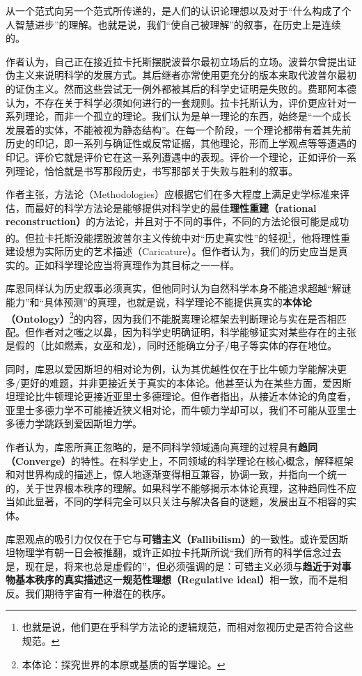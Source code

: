 \documentclass[12pt, a4paper, oneside]{ctexart}
\renewcommand{\b}{\textbf}
\newcommand{\f}{\footnote}
\begin{document}
从一个范式向另一个范式所传递的，是人们的认识论理想以及对于“什么构成了个人智慧进步”的理解。也就是说，我们“使自己被理解”的叙事，在历史上是连续的。

作者认为，自己正在接近拉卡托斯摆脱波普尔最初立场后的立场。波普尔曾提出证伪主义来说明科学的发展方式。其后继者亦常使用更充分的版本来取代波普尔最初的证伪主义。然而这些尝试无一例外都被其后的科学史证明是失败的。费耶阿本德认为，不存在关于科学必须如何进行的一套规则。拉卡托斯认为，评价更应针对一系列理论，而非一个孤立的理论。我们认为是单一理论的东西，始终是“一个成长发展着的实体，不能被视为静态结构”。在每一个阶段，一个理论都带有着其先前历史的印记，即一系列与确证性或反常证据，其他理论，形而上学观点等等遭遇的印记。评价它就是评价它在这一系列遭遇中的表现。评价一个理论，正如评价一系列理论，恰恰就是书写那段历史，书写那部关于失败与胜利的叙事。

作者主张，方法论（Methodologies）应根据它们在多大程度上满足史学标准来评估，而最好的科学方法论是能够提供对科学史的最佳\b{理性重建（rational reconstruction）}的方法论，并且对于不同的事件，不同的方法论很可能是成功的。但拉卡托斯没能摆脱波普尔主义传统中对“历史真实性”的轻视\f{也就是说，他们更在乎科学方法论的逻辑规范，而相对忽视历史是否符合这些规范。}，他将理性重建设想为实际历史的艺术描述（Caricature）。但作者认为，我们的历史应当是真实的。正如科学理论应当将真理作为其目标之一一样。

库恩同样认为历史叙事必须真实，但他同时认为自然科学本身不能追求超越“解谜能力”和“具体预测”的真理，也就是说，科学理论不能提供真实的\b{本体论（Ontology）}\f{本体论：探究世界的本原或基质的哲学理论。}的内容，因为我们不能脱离理论框架去判断理论与实在是否相匹配。但作者对之嗤之以鼻，因为科学史明确证明，科学能够证实对某些存在的主张是假的（比如燃素，女巫和龙），同时还能确立分子/电子等实体的存在地位。

同时，库恩以爱因斯坦的相对论为例，认为其优越性仅在于比牛顿力学能解决更多/更好的难题，并非更接近关于真实的本体论。他甚至认为在某些方面，爱因斯坦理论比牛顿理论更接近亚里士多德理论。但作者指出，从接近本体论的角度看，亚里士多德力学不可能接近狭义相对论，而牛顿力学却可以，我们不可能从亚里士多德力学跳跃到爱因斯坦力学。

作者认为，库恩所真正忽略的，是不同科学领域通向真理的过程具有\b{趋同（Converge）}的特性。在科学史上，不同领域的科学理论在核心概念，解释框架和对世界构成的描述上，惊人地逐渐变得相互兼容，协调一致，并指向一个统一的，关于世界根本秩序的理解。如果科学不能够揭示本体论真理，这种趋同性不应当如此显著，不同的学科完全可以只关注与解决各自的谜题，发展出互不相容的实体。

库恩观点的吸引力仅仅在于它与\b{可错主义（Fallibilism）}的一致性。或许爱因斯坦物理学有朝一日会被推翻，或许正如拉卡托斯所说“我们所有的科学信念过去是，现在是，将来也总是虚假的”，但必须强调的是：可错主义必须与\b{趋近于对事物基本秩序的真实描述}这一\b{规范性理想（Regulative ideal）}相一致，而不是相反。我们期待宇宙有一种潜在的秩序。
\end{document}
